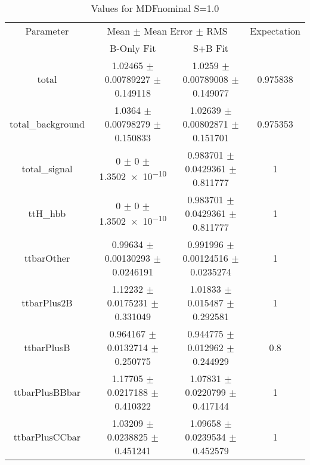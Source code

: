 \begin{table}
\centering
\caption{Values for MDFnominal S=1.0}
\begin{tabular}{cccc}
\toprule
Parameter & \multicolumn{2}{c}{Mean $\pm$ Mean Error $\pm$ RMS} & Expectation\\
 & B-Only Fit & S+B Fit & \\
\midrule
total & \num{1.02465} $\pm$ \num{0.00789227} $\pm$ \num{0.149118} & \num{1.0259} $\pm$ \num{0.00789008} $\pm$ \num{0.149077} & \num{0.975838}\\
total\_background & \num{1.0364} $\pm$ \num{0.00798279} $\pm$ \num{0.150833} & \num{1.02639} $\pm$ \num{0.00802871} $\pm$ \num{0.151701} & \num{0.975353}\\
total\_signal & \num{0} $\pm$ \num{0} $\pm$ \num{1.3502e-10} & \num{0.983701} $\pm$ \num{0.0429361} $\pm$ \num{0.811777} & \num{1}\\
ttH\_hbb & \num{0} $\pm$ \num{0} $\pm$ \num{1.3502e-10} & \num{0.983701} $\pm$ \num{0.0429361} $\pm$ \num{0.811777} & \num{1}\\
ttbarOther & \num{0.99634} $\pm$ \num{0.00130293} $\pm$ \num{0.0246191} & \num{0.991996} $\pm$ \num{0.00124516} $\pm$ \num{0.0235274} & \num{1}\\
ttbarPlus2B & \num{1.12232} $\pm$ \num{0.0175231} $\pm$ \num{0.331049} & \num{1.01833} $\pm$ \num{0.015487} $\pm$ \num{0.292581} & \num{1}\\
ttbarPlusB & \num{0.964167} $\pm$ \num{0.0132714} $\pm$ \num{0.250775} & \num{0.944775} $\pm$ \num{0.012962} $\pm$ \num{0.244929} & \num{0.8}\\
ttbarPlusBBbar & \num{1.17705} $\pm$ \num{0.0217188} $\pm$ \num{0.410322} & \num{1.07831} $\pm$ \num{0.0220799} $\pm$ \num{0.417144} & \num{1}\\
ttbarPlusCCbar & \num{1.03209} $\pm$ \num{0.0238825} $\pm$ \num{0.451241} & \num{1.09658} $\pm$ \num{0.0239534} $\pm$ \num{0.452579} & \num{1}\\
\bottomrule
\end{tabular}
\end{table}